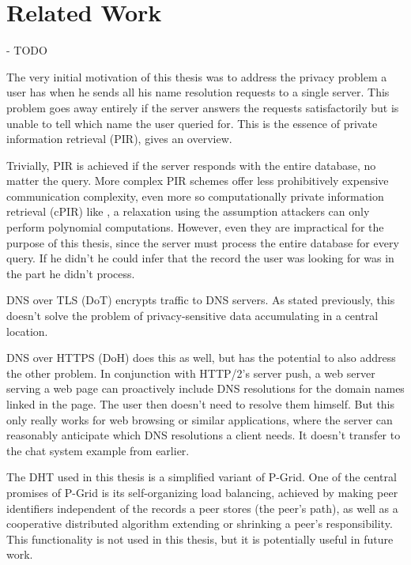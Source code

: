 \section{Related Work}
- TODO

The very initial motivation of this thesis was to address the privacy problem a
user has when he sends all his name resolution requests to a single server. This
problem goes away entirely if the server answers the requests satisfactorily but
is unable to tell which name the user queried for. This is the essence of
private information retrieval (PIR), \cite{gasarch2004survey} gives an overview.

Trivially, PIR is achieved if the server responds with the entire database, no
matter the query. More complex PIR schemes offer less prohibitively expensive
communication complexity, even more so computationally private information
retrieval (cPIR) like \cite{cachin1999computationally}, a relaxation using the
assumption attackers can only perform polynomial computations. However, even
they are impractical for the purpose of this thesis, since the server must
process the entire database for every query. If he didn't he could infer that
the record the user was looking for was in the part he didn't process.

DNS over TLS (DoT)\cite{RFC7858} encrypts traffic to DNS servers. As stated
previously, this doesn't solve the problem of privacy-sensitive data
accumulating in a central location.

DNS over HTTPS (DoH)\cite{RFC8484} does this as well, but has the potential to
also address the other problem. In conjunction with HTTP/2's server
push\cite{RFC7540}, a web server serving a web page can proactively include DNS
resolutions for the domain names linked in the page. The user then doesn't need
to resolve them himself. But this only really works for web browsing or similar
applications, where the server can reasonably anticipate which DNS resolutions a
client needs. It doesn't transfer to the chat system example from earlier.

The \ac{DHT} used in this thesis is a simplified variant of
P-Grid\cite{aberer2001pgrid}. One of the central promises of P-Grid is its
self-organizing load balancing, achieved by making peer identifiers independent
of the records a peer stores (the peer's path), as well as a cooperative
distributed algorithm extending or shrinking a peer's responsibility. This
functionality is not used in this thesis, but it is potentially useful in future
work.

